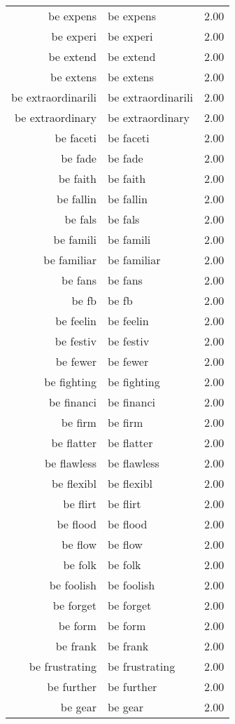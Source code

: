 \begin{table}[ht]
\begin{tabular}{rlr}
  be expens & be expens & 2.00 \\ 
  be experi & be experi & 2.00 \\ 
  be extend & be extend & 2.00 \\ 
  be extens & be extens & 2.00 \\ 
  be extraordinarili & be extraordinarili & 2.00 \\ 
  be extraordinary & be extraordinary & 2.00 \\ 
  be faceti & be faceti & 2.00 \\ 
  be fade & be fade & 2.00 \\ 
  be faith & be faith & 2.00 \\ 
  be fallin & be fallin & 2.00 \\ 
  be fals & be fals & 2.00 \\ 
  be famili & be famili & 2.00 \\ 
  be familiar & be familiar & 2.00 \\ 
  be fans & be fans & 2.00 \\ 
  be fb & be fb & 2.00 \\ 
  be feelin & be feelin & 2.00 \\ 
  be festiv & be festiv & 2.00 \\ 
  be fewer & be fewer & 2.00 \\ 
  be fighting & be fighting & 2.00 \\ 
  be financi & be financi & 2.00 \\ 
  be firm & be firm & 2.00 \\ 
  be flatter & be flatter & 2.00 \\ 
  be flawless & be flawless & 2.00 \\ 
  be flexibl & be flexibl & 2.00 \\ 
  be flirt & be flirt & 2.00 \\ 
  be flood & be flood & 2.00 \\ 
  be flow & be flow & 2.00 \\ 
  be folk & be folk & 2.00 \\ 
  be foolish & be foolish & 2.00 \\ 
  be forget & be forget & 2.00 \\ 
  be form & be form & 2.00 \\ 
  be frank & be frank & 2.00 \\ 
  be frustrating & be frustrating & 2.00 \\ 
  be further & be further & 2.00 \\ 
  be gear & be gear & 2.00 \\ 

\end{tabular}
\end{table}
